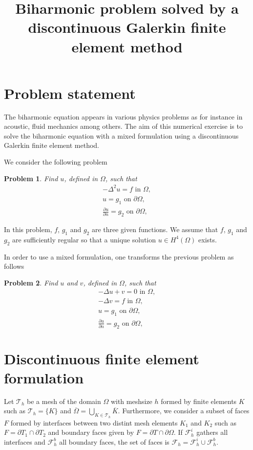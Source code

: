 \documentclass[a4paper,11pt]{article}
\title{Biharmonic problem solved by a discontinuous Galerkin finite element method}
\newtheorem{Pb}{Problem}
\begin{document}
\maketitle

\section{Problem statement}

The biharmonic equation appears in various physics problems as for instance in acoustic, fluid mechanics among others. The aim of this numerical exercise is to solve the biharmonic equation with a mixed formulation using a discontinuous Galerkin finite element method.

We consider the following problem

\begin{Pb}
  Find $u$, defined in $\Omega$, such that
  \begin{eqnarray}
    -\Delta^2u=f\mbox{ in }\Omega,\\
     u=g_1\mbox{ on }\partial\Omega,\\
     \frac{\partial u}{\partial n}=g_2\mbox{ on }\partial\Omega,
  \end{eqnarray}
\end{Pb}

In this problem, $f$, $g_1$ and $g_2$ are three given functions. We assume that $f$, $g_1$ and $g_2$ are sufficiently regular so that a unique solution $u\in H^4(\Omega)$ exists.

In order to use a mixed formulation, one transforms the previous problem as follows
\begin{Pb}
  Find $u$ and $v$, defined in $\Omega$, such that
  \begin{eqnarray}
    -\Delta u+v=0\mbox{ in }\Omega,\\
    -\Delta v=f\mbox{ in }\Omega,\\
     u=g_1\mbox{ on }\partial\Omega,\\
     \frac{\partial u}{\partial n}=g_2\mbox{ on }\partial\Omega,
  \end{eqnarray}
\end{Pb}

\section{Discontinuous finite element formulation}

Let $\mathcal{T}_h$ be a mesh of the domain $\Omega$ with meshsize $h$ formed by finite elements $K$ such as $\mathcal{T}_h=\{K\}$ and $\overline{\Omega}=\bigcup_{K\in\mathcal{T}_h}\overline{K}$. Furthermore, we consider a subset of faces $F$ formed by interfaces between two distint mesh elements $K_1$ and $K_2$ such as $F=\partial T_1\cap\partial T_2$ and boundary faces given by $F=\partial T\cap\partial \Omega$. If $\mathcal{F}^i_h$ gathers all interfaces and $\mathcal{F}^b_h$ all boundary faces, the set of faces is $\mathcal{F}_h=\mathcal{F}^i_h\cup\mathcal{F}^b_h$.
\end{document}
